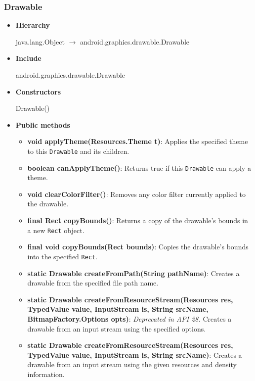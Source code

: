 \documentclass{report}
\begin{document}
    \subsubsection{Drawable}
    \begin{itemize}
        \item \textbf{Hierarchy} 
            \begin{center}
                java.lang.Object $\to$	android.graphics.drawable.Drawable
            \end{center}
        \item \textbf{Include}
            \bigbreak \noindent 
            \begin{javacode}
                android.graphics.drawable.Drawable
            \end{javacode}
        \item \textbf{Constructors}
            \bigbreak \noindent 
            \begin{javacode}
                Drawable()
            \end{javacode}
        \item \textbf{Public methods}
            \begin{itemize}
                \item \textbf{void applyTheme(Resources.Theme t)}: Applies the specified theme to this \texttt{Drawable} and its children.
                \item \textbf{boolean canApplyTheme()}: Returns true if this \texttt{Drawable} can apply a theme.
                \item \textbf{void clearColorFilter()}: Removes any color filter currently applied to the drawable.
                \item \textbf{final Rect copyBounds()}: Returns a copy of the drawable’s bounds in a new \texttt{Rect} object.
                \item \textbf{final void copyBounds(Rect bounds)}: Copies the drawable’s bounds into the specified \texttt{Rect}.
                \item \textbf{static Drawable createFromPath(String pathName)}: Creates a drawable from the specified file path name.
                \item \textbf{static Drawable createFromResourceStream(Resources res, TypedValue value, InputStream is, String srcName, BitmapFactory.Options opts)}: \textit{Deprecated in API 28.} Creates a drawable from an input stream using the specified options.
                \item \textbf{static Drawable createFromResourceStream(Resources res, TypedValue value, InputStream is, String srcName)}: Creates a drawable from an input stream using the given resources and density information.

\end{itemize}
\end{itemize}
\end{document}
